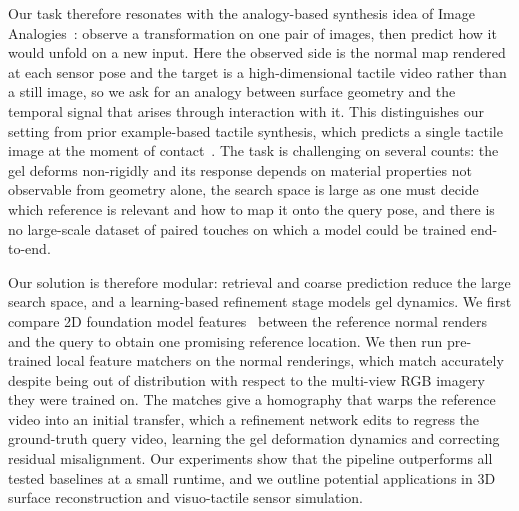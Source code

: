 Our task therefore resonates with the analogy-based synthesis idea of Image
Analogies~\cite{imageanalogies}: observe a transformation on one pair of images, then predict how it
would unfold on a new input. Here the observed side is the normal map rendered at each sensor pose
and the target is a high-dimensional tactile video rather than a still image, so we ask for an
analogy between surface geometry and the temporal signal that arises through interaction with it.
This distinguishes our setting from prior example-based tactile synthesis, which predicts a single
tactile image at the moment of contact~\cite{tactiledreamfusion,tarf,objectfolder}. The task is
challenging on several counts: the gel deforms non-rigidly and its response depends on material
properties not observable from geometry alone, the search space is large as one must decide which
reference is relevant and how to map it onto the query pose, and there is no large-scale dataset of
paired touches on which a model could be trained end-to-end.

Our solution is therefore modular: retrieval and coarse prediction reduce the large search space,
and a learning-based refinement stage models gel dynamics. We first compare 2D foundation model
features~\cite{dinov3} between the reference normal renders and the query to obtain one promising
reference location. We then run pre-trained local feature matchers on the normal renderings, which
match accurately despite being out of distribution with respect to the multi-view RGB imagery they
were trained on. The matches give a homography that warps the reference video into an initial
transfer, which a refinement network edits to regress the ground-truth query video, learning the
gel deformation dynamics and correcting residual misalignment. Our experiments show that the
pipeline outperforms all tested baselines at a small runtime, and we outline potential applications
in 3D surface reconstruction and visuo-tactile sensor simulation.
